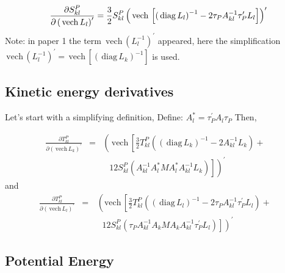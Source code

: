 \documentclass[12pt,thmsa,suthesis,verbatim]{report}
\begin{document}
\begin{equation}
\frac{\partial S_{kl}^P}{\partial \left( \,\mathrm{vech}\,L_l\right)
^{\prime }}=\frac 32S_{kl}^P\left( \,\mathrm{vech}\,\left[ \left( \,\mathrm{%
diag}\,L_l\right) ^{-1}-2\tau _PA_{kl}^{-1}\tau _P^{\prime }L_l\right]
\right) ^{\prime }
\end{equation}
Note: in paper 1 the term $\,\mathrm{vech}\,\left( L_l^{-1}\right) ^{\prime
} $ appeared, here the simplification $\,\mathrm{vech}\,\left(
L_l^{-1}\right) ^{\prime }=\,\mathrm{vech}\,\left[ \left( \,\mathrm{diag}%
\,L_k\right) ^{-1}\right] $ is used.

\subsection{Kinetic energy derivatives}

Let's start with a simplifying definition, Define: $A_l^{*}=\tau _P^{\prime
}A_l\tau _P$ Then,

\begin{eqnarray}
\frac{\partial T_{kl}^P}{\partial \left( \,\mathrm{vech}\,L_k\right)
^{\prime }} &=&\left( \,\mathrm{vech}\,\left[ \frac 32T_{kl}^P\left( \left(
\,\mathrm{diag}\,L_k\right) ^{-1}-2A_{kl}^{-1}L_k\right) + 
\begin{array}{c}
\end{array}
\right. \right.  \nonumber \\
&&\left. \left. 
\begin{array}{c}
\end{array}
12S_{kl}^P\left( A_{kl}^{-1}A_l^{*}MA_l^{*}A_{kl}^{-1}L_k\right) \right]
\right) ^{\prime }
\end{eqnarray}
and 
\begin{eqnarray}
\frac{\partial T_{kl}^P}{\partial \left( \,\mathrm{vech}\,L_l\right)
^{\prime }} &=&\,\left( \mathrm{vech}\,\left[ \frac 32T_{kl}^P\left( \left(
\,\mathrm{diag}\,L_l\right) ^{-1}-2\tau _PA_{kl}^{-1}\tau _P^{\prime
}L_l\right) + 
\begin{array}{c}
\end{array}
\right. \right.  \nonumber \\
&&\left. \left. 
\begin{array}{c}
\end{array}
12S_{kl}^P\left( \tau _PA_{kl}^{-1}A_kMA_kA_{kl}^{-1}\tau _P^{\prime
}L_l\right) \right] \right) ^{\prime }
\end{eqnarray}

\subsection{Potential Energy}
\end{document}
